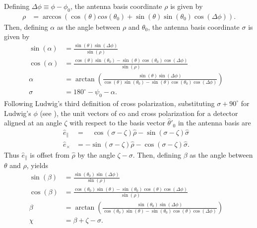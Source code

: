 \documentclass[a4paper,11pt]{article}
\newcommand{\co}{\mathbin{\|}}
\newcommand{\cx}{\mathbin{\times}}
\begin{document}
Defining $\Delta \phi \equiv \phi - \phi_0$, the antenna basis coordinate $\rho$ is given by
%
\begin{align}
\rho  &= \arccos( \cos(\theta) cos(\theta_0) + \sin(\theta) \sin(\theta_0) \cos(\Delta \phi) ).
\end{align}
%
Then, defining $\alpha$ as the angle between $\rho$ and $\theta_0$, the antenna basis coordinate $\sigma$ is given by
%
\begin{align}
\sin(\alpha) &= \frac{\sin(\theta) \sin(\Delta \phi)}{\sin(\rho)} & \\
\cos(\alpha) &= \frac{\cos(\theta) \sin(\theta_0) - \sin(\theta) \cos(\theta_0) \cos(\Delta \phi)}{\sin(\rho)} & \\ 
\alpha       &=  \arctan \left(\frac{\sin(\theta) \sin(\Delta \phi)}{\cos(\theta) \sin(\theta_0) - \sin(\theta) \cos(\theta_0) \cos(\Delta \phi)} \right)  & \\
\sigma &= 180^{\circ} - \psi_0 - \alpha. &
\end{align}
%
Following Ludwig's third definition of cross polarization, substituting $\sigma + 90^{\circ}$ for Ludwig's $\phi$ (see \cite{1140406}), the unit vectors of co and cross polarization for a detector aligned at an angle $\zeta$ with respect to the basis vector $\hat{\theta}'_0$ in the antenna basis are
%
\begin{align}
\hat{e}_{\co} &=  \quad \cos(\sigma - \zeta) \hat{\rho} - \sin(\sigma - \zeta) \hat{\sigma} & \\
\hat{e}_{\cx} &=      - \sin(\sigma - \zeta) \hat{\rho} - \cos(\sigma - \zeta) \hat{\sigma}. & 
\end{align}
%
Thus $\hat{e}_{\co}$ is offset from $\hat{\rho}$ by the angle $\zeta - \sigma$. Then, defining $\beta$ as the angle between $\theta$ and $\rho$, yields
%
\begin{align}
\sin(\beta) &= \frac{\sin(\theta_0) \sin(\Delta \phi)}{\sin(\rho)} & \\
\cos(\beta) &= \frac{\cos(\theta_0) \sin(\theta) - \sin(\theta_0) \cos(\theta) \cos(\Delta \phi)}{\sin(\rho)} & \\ 
\beta       &=  \arctan \left(\frac{\sin(\theta_0) \sin(\Delta \phi)}{\cos(\theta_0) \sin(\theta) - \sin(\theta_0) \cos(\theta) \cos(\Delta \phi)} \right)  & \\
\chi &= \beta + \zeta - \sigma. &
\end{align}
\end{document}
